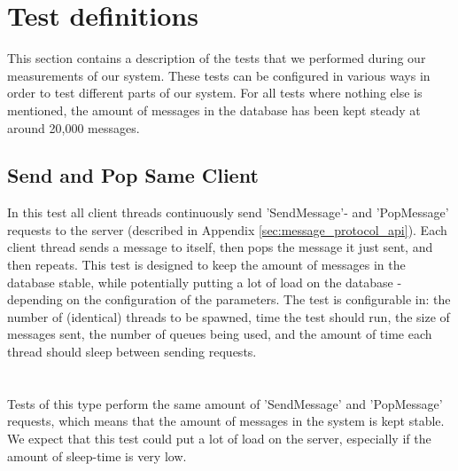 \documentclass{article}
\begin{document}
    \section{Test definitions}
        This section contains a description of the tests that we performed during our measurements of our system. These tests can be configured in various ways in order to test different parts of our system. For all tests where nothing else is mentioned, the amount of messages in the database has been kept steady at around 20,000 messages.

        \subsection{Send and Pop Same Client}
            In this test all client threads continuously send 'SendMessage'- and 'PopMessage' requests to the server (described in Appendix \ref{sec:message_protocol_api}). Each client thread sends a message to itself, then pops the message it just sent, and then repeats. This test is designed to keep the amount of messages in the database stable, while potentially putting a lot of load on the database - depending on the configuration of the parameters. The test is configurable in: the number of (identical) threads to be spawned, time the test should run, the size of messages sent, the number of queues being used, and the amount of time each thread should sleep between sending requests.\\
            \\
            \\
            Tests of this type perform the same amount of 'SendMessage' and 'PopMessage' requests, which means that the amount of messages in the system is kept stable. We expect that this test could put a lot of load on the server, especially if the amount of sleep-time is very low.
\end{document}
